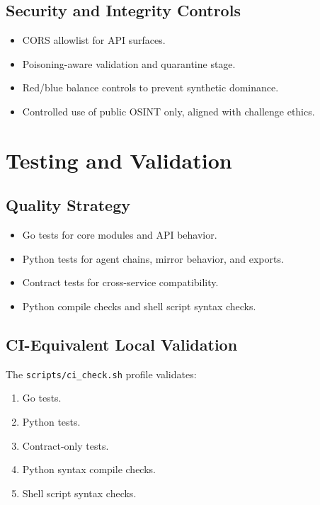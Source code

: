 \documentclass[11pt,a4paper]{article}
\begin{document}
\subsection{Security and Integrity Controls}
\begin{itemize}[leftmargin=1.5em]
  \item CORS allowlist for API surfaces.
  \item Poisoning-aware validation and quarantine stage.
  \item Red/blue balance controls to prevent synthetic dominance.
  \item Controlled use of public OSINT only, aligned with challenge ethics.
\end{itemize}

\section{Testing and Validation}
\subsection{Quality Strategy}
\begin{itemize}[leftmargin=1.5em]
  \item Go tests for core modules and API behavior.
  \item Python tests for agent chains, mirror behavior, and exports.
  \item Contract tests for cross-service compatibility.
  \item Python compile checks and shell script syntax checks.
\end{itemize}

\subsection{CI-Equivalent Local Validation}
The \texttt{scripts/ci\_check.sh} profile validates:
\begin{enumerate}[leftmargin=1.5em]
  \item Go tests.
  \item Python tests.
  \item Contract-only tests.
  \item Python syntax compile checks.
  \item Shell script syntax checks.
\end{enumerate}
\end{document}
